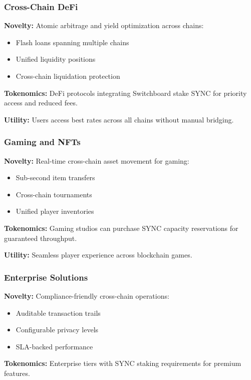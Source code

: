 \documentclass[12pt,a4paper]{article}
\begin{document}
\subsubsection{Cross-Chain DeFi}

\textbf{Novelty:} Atomic arbitrage and yield optimization across chains:
\begin{itemize}
    \item Flash loans spanning multiple chains
    \item Unified liquidity positions
    \item Cross-chain liquidation protection
\end{itemize}

\textbf{Tokenomics:} DeFi protocols integrating Switchboard stake SYNC for priority access and reduced fees.

\textbf{Utility:} Users access best rates across all chains without manual bridging.

\subsubsection{Gaming and NFTs}

\textbf{Novelty:} Real-time cross-chain asset movement for gaming:
\begin{itemize}
    \item Sub-second item transfers
    \item Cross-chain tournaments
    \item Unified player inventories
\end{itemize}

\textbf{Tokenomics:} Gaming studios can purchase SYNC capacity reservations for guaranteed throughput.

\textbf{Utility:} Seamless player experience across blockchain games.

\subsubsection{Enterprise Solutions}

\textbf{Novelty:} Compliance-friendly cross-chain operations:
\begin{itemize}
    \item Auditable transaction trails
    \item Configurable privacy levels
    \item SLA-backed performance
\end{itemize}

\textbf{Tokenomics:} Enterprise tiers with SYNC staking requirements for premium features.
\end{document}
